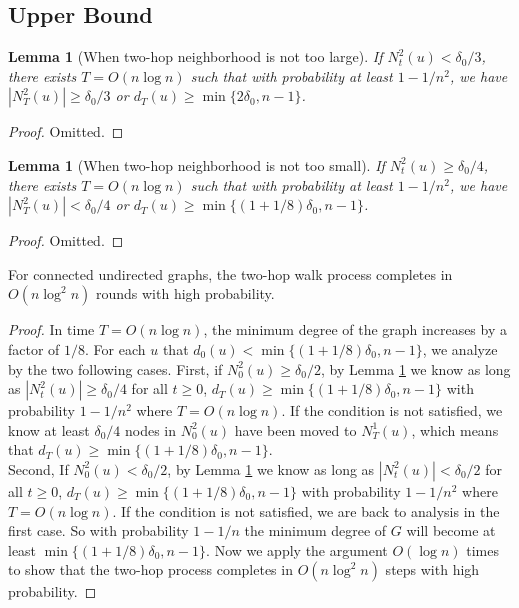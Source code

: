 \documentclass[
10pt, %
a4paper, %
oneside, %
headinclude,footinclude, %
BCOR5mm, %
]{scrartcl}
\newtheorem{lemma}[theorem]{\textbf{Lemma}}
\begin{document}
\subsection{Upper Bound}
\begin{lemma}[When two-hop neighborhood is not too large]\label{lem:10}
	If $N_t^2(u) < \delta_0/3$, there exists $T = O(n\log n)$ such that with probability at least $1 - 1/n^2$, we have $|N_T^2(u)| \geq \delta_0/3$ or $d_T(u) \geq \min \{2\delta_0, n-1\}$.
\end{lemma}
\begin{proof}
	Omitted.
\end{proof}
\begin{lemma}[When two-hop neighborhood is not too small]\label{lem:11}
	If $N_t^2(u) \geq \delta_0/4$, there exists $T = O(n\log n)$ such that with probability at least $1 - 1/n^2$, we have $|N_T^2(u)| < \delta_0/4$ or $d_T(u) \geq \min \{(1+1/8)\delta_0, n-1\}$.
\end{lemma}
\begin{proof}
	Omitted.
\end{proof}

\begin{theorem}\label{thm:12}
	For connected undirected graphs, the two-hop walk process completes in $O(n\log^2 n)$ rounds with high probability. 
\end{theorem}
\begin{proof}
	In time $T = O(n\log n)$, the minimum degree of the graph increases by a factor of $1/8$. For each $u$ that $d_0(u) < \min \{(1+1/8)\delta_0, n-1\}$, we analyze by the two following cases. First, if $N_0^2(u) \geq \delta_0/2$, by Lemma \ref{lem:11} we know as long as $|N_t^2(u)| \geq \delta_0/4$ for all $t \geq 0$, $d_T(u) \geq \min \{(1+1/8)\delta_0, n-1\}$ with probability $1 - 1/n^2$ where $T = O(n \log n)$. If the condition is not satisfied, we know at least $\delta_0/4$ nodes in $N_0^2(u)$ have been moved to $N_T^1(u)$, which means that $d_T(u) \geq \min \{(1+1/8)\delta_0, n-1\}.$ \\
	Second, If $N_0^2(u) < \delta_0/2$,  by Lemma \ref{lem:10} we know as long as $|N_t^2(u)| < \delta_0/2$ for all $t \geq 0$,  $d_T(u) \geq \min \{(1+1/8)\delta_0, n-1\}$ with probability $1 - 1/n^2$ where $T = O(n \log n)$. 
	If the condition is not satisfied, we are back to analysis in the first case. So with probability $ 1 - 1/n$ the minimum degree of $G$ will become at least $\min \{(1+1/8)\delta_0, n-1\}$. Now we apply the argument $O(\log n)$ times to show that the two-hop process completes in $O(n\log^2n)$ steps with high probability. 
\end{proof}
\end{document}
